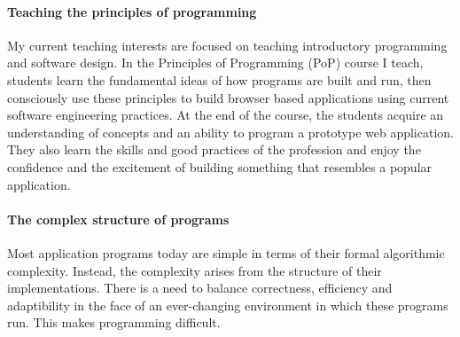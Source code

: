 \documentclass[
9pt, 
]{article}
\begin{document}


\paragraph{Teaching the principles of programming}
My current teaching interests are focused on teaching
introductory programming and software design.  In the
Principles of Programming (PoP) course I teach, students
learn the fundamental ideas of how programs are built and
run, then consciously use these principles to build browser
based applications using current software engineering
practices.  At the end of the course, the students acquire
an understanding of concepts and an ability to program a
prototype web application.  They also learn the skills and
good practices of the profession and enjoy the confidence
and the excitement of building something that resembles a
popular application.

\paragraph{The complex structure of programs}
Most application programs today are simple in terms of their
formal algorithmic complexity.  Instead, the complexity
arises from the structure of their implementations.  There
is a need to balance correctness, efficiency and
adaptibility in the face of an ever-changing environment in
which these programs run.  This makes programming difficult.
\end{document}
